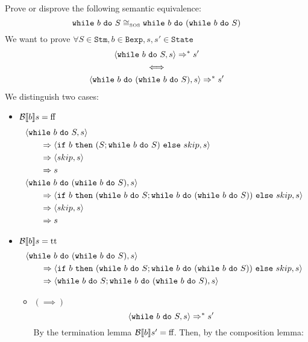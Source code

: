 \begin{exercise}{
    Prove or disprove the following semantic equivalence:
    \[ \texttt{while}\ b\ \texttt{do}\ S \cong_{\text{\tiny SOS}} \texttt{while}\ b\ \texttt{do}\ (\texttt{while}\ b\ \texttt{do}\ S)  \]
}
    We want to prove $\forall S \in \texttt{Stm}, b \in \texttt{Bexp}, s, s' \in \texttt{State}$
    \begin{gather*}
        \left<\texttt{while}\ b\ \texttt{do}\ S, s\right> \Rightarrow^* s' \\
        \iff \\
        \left<\texttt{while}\ b\ \texttt{do}\ (\texttt{while}\ b\ \texttt{do}\ S), s\right> \Rightarrow^* s'
    \end{gather*}
    We distinguish two cases:
    \begin{itemize}
        \item $\mathcal{B} \llbracket b \rrbracket s = \text{ff}$
            \begin{align*}
                &\left<\texttt{while}\ b\ \texttt{do}\ S, s\right>
                \\&\qquad\Rightarrow \left<\texttt{if}\ b\ \texttt{then}\ (S; \texttt{while}\ b\ \texttt{do}\ S)\ \texttt{else}\ skip, s\right>
                \\&\qquad\Rightarrow \left<skip, s\right>
                \\&\qquad\Rightarrow s
                \\
                &\left<\texttt{while}\ b\ \texttt{do}\ (\texttt{while}\ b\ \texttt{do}\ S), s\right>
                \\&\qquad\Rightarrow \left<\texttt{if}\ b\ \texttt{then}\ (\texttt{while}\ b\ \texttt{do}\ S; \texttt{while}\ b\ \texttt{do}\ (\texttt{while}\ b\ \texttt{do}\ S))\ \texttt{else}\ skip, s\right>
                \\&\qquad\Rightarrow \left<skip, s\right>
                \\&\qquad\Rightarrow s
            \end{align*}
        \item $\mathcal{B} \llbracket b \rrbracket s = \text{tt}$
            \begin{align*}
                &\left<\texttt{while}\ b\ \texttt{do}\ (\texttt{while}\ b\ \texttt{do}\ S), s\right>
                \\&\qquad\Rightarrow \left<\texttt{if}\ b\ \texttt{then}\ (\texttt{while}\ b\ \texttt{do}\ S; \texttt{while}\ b\ \texttt{do}\ (\texttt{while}\ b\ \texttt{do}\ S))\ \texttt{else}\ skip, s\right>
                \\&\qquad\Rightarrow \left<\texttt{while}\ b\ \texttt{do}\ S; \texttt{while}\ b\ \texttt{do}\ (\texttt{while}\ b\ \texttt{do}\ S), s\right>
            \end{align*}
            \begin{itemize}
                \item $(\implies)$
                    \[ \left<\texttt{while}\ b\ \texttt{do}\ S, s\right> \Rightarrow^* s' \]
                    By the termination lemma $\mathcal{B} \llbracket b \rrbracket s' = \text{ff}$. Then, by the composition lemma:
                    \begin{align*}

\end{align*}
\end{itemize}
\end{itemize}
\end{exercise}
